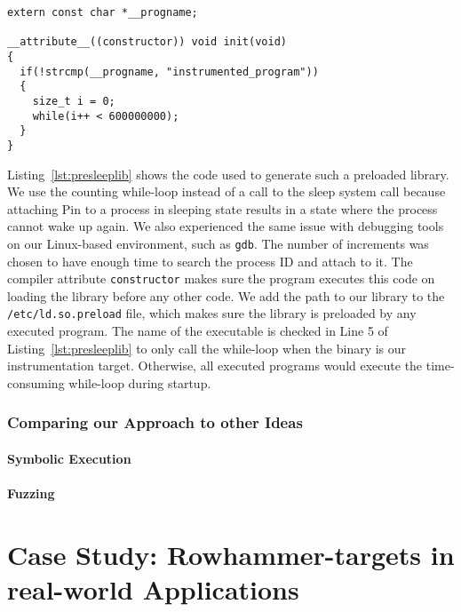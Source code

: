 \begin{minipage}{\linewidth}
\begin{lstlisting}[style=CStyle,
                   caption={Code of the preloaded library to keep the process
waiting for some milliseconds, which gives enough time for Pin to attach to the
process.},
label=lst:presleeplib]
extern const char *__progname;

__attribute__((constructor)) void init(void)
{
  if(!strcmp(__progname, "instrumented_program"))
  {
    size_t i = 0;
    while(i++ < 600000000);
  }
}
\end{lstlisting}
\end{minipage}

Listing~\ref{lst:presleeplib} shows the code used to generate such a preloaded
library. We use the counting while-loop instead of a call to the sleep system
call because attaching Pin to a process in sleeping state results in a state
where the process cannot wake up again. We also experienced the same issue with
debugging tools on our Linux-based environment, such as \texttt{gdb}. The number
of increments was chosen to have enough time to search the process ID and attach
to it. The compiler attribute \texttt{constructor} makes sure the program
executes this code on loading the library before any other code. We add the path
to our library to the \texttt{/etc/ld.so.preload} file, which makes sure the
library is preloaded by any executed program. The name of the executable is
checked in Line 5 of Listing~\ref{lst:presleeplib} to only call the while-loop
when the binary is our instrumentation target. Otherwise, all executed programs
would execute the time-consuming while-loop during startup.

\subsection{Comparing our Approach to other Ideas}

\subsubsection{Symbolic Execution}

\subsubsection{Fuzzing}


\chapter{Case Study: Rowhammer-targets in real-world Applications}
\label{sec:results}

